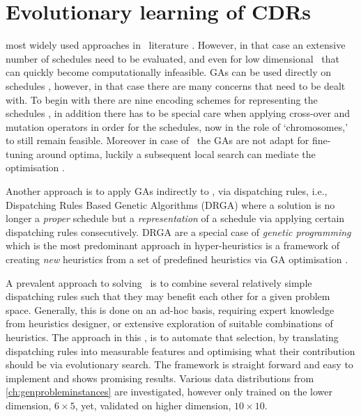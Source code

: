 

\chapter{Evolutionary learning of CDRs}\label{ch:esmodels} 


 most widely used approaches in \JSP\ literature \citep{Pinedo08}. However, in that case an extensive number of schedules need to be evaluated, and even for low dimensional \JSP\ that can quickly become computationally infeasible.
GAs can be used directly on schedules \citep{Cheng96,Cheng99,Tsai07,Qing-dao-er-ji12,Ak12,Meeran12}, however, in that case there are many concerns that need to be dealt with. To begin with there are nine encoding schemes for representing the schedules \cite{Cheng96}, in addition there has to be special care when applying cross-over and mutation operators in order for the schedules, now in the role of `chromosomes,' to still remain feasible. Moreover in case of \JSP\ the GAs are not adapt for fine-tuning around optima, luckily a subsequent local search can mediate the optimisation \citep{Cheng99,Meeran12}.

Another approach is to apply GAs indirectly to \JSP , via dispatching rules, i.e., Dispatching Rules Based Genetic Algorithms (DRGA) \citep{Vazquez-Rodriguez09,Dhingra10,Nguyen13} where a solution is no longer a \emph{proper} schedule but a \emph{representation} of a schedule via applying certain dispatching rules consecutively. 
DRGA are a special case of \emph{genetic programming} \citep{Koza05} which is the most predominant approach in hyper-heuristics is a framework of creating \emph{new} heuristics from a set of  predefined heuristics via GA optimisation \citep{Burke10}. 

A prevalent approach to solving \JSP\ is to combine several relatively simple dispatching rules such that they may benefit each other for a given problem space. Generally, this is done on an ad-hoc basis, requiring expert knowledge from heuristics designer, or extensive exploration of suitable combinations of heuristics. The approach in this , is to automate that selection, by translating dispatching rules into measurable features and optimising what their contribution should be via evolutionary search. The framework is straight forward and easy to implement and shows promising results. Various data distributions from \cref{ch:genprobleminstances} are investigated, however only trained on the lower dimension, $6\times5$, yet, validated on higher dimension, $10\times10$. 

